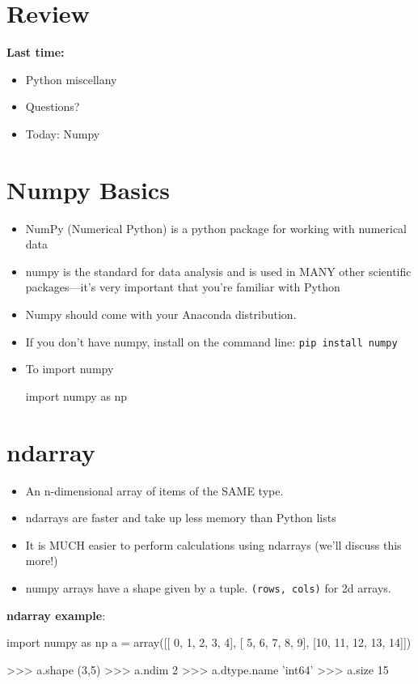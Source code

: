 \documentclass[12pt]{article}
\numberwithin{equation}{section}
\begin{document}
\section{Review}

\textbf{Last time:}
\begin{itemize}
    \item Python miscellany
    \item Questions?
    \item Today: Numpy
\end{itemize}

\section{Numpy Basics}
\begin{itemize}
    \item NumPy (Numerical Python) is a python package for working with numerical data
    \item numpy is the standard for data analysis and is used in MANY other scientific packages---it's very important that you're familiar with Python
    \item Numpy should come with your Anaconda distribution.
    \item If you don't have numpy, install on the command line: \verb|pip install numpy|
    \item To import numpy
    \begin{python}
    import numpy as np
    \end{python}
\end{itemize}

\section{ndarray}
\begin{itemize}
    \item An n-dimensional array of items of the SAME type.
    \item ndarrays are faster and take up less memory than Python lists
    \item It is MUCH easier to perform calculations using ndarrays (we'll discuss this more!)
    \item numpy arrays have a shape given by a tuple. \verb|(rows, cols)| for 2d arrays.
\end{itemize}

\textbf{ndarray example}:
\begin{python}
import numpy as np
a = array([[ 0,  1,  2,  3,  4],
           [ 5,  6,  7,  8,  9],
           [10, 11, 12, 13, 14]])

>>> a.shape
(3,5)
>>> a.ndim
2
>>> a.dtype.name
'int64'
>>> a.size
15
\end{python}
\end{document}
